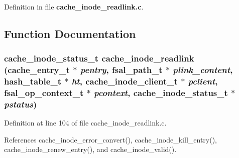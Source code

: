Definition in file {\bf cache\_\-inode\_\-readlink.c}.

\subsection{Function Documentation}
\subsubsection{\setlength{\rightskip}{0pt plus 5cm}cache\_\-inode\_\-status\_\-t cache\_\-inode\_\-readlink (cache\_\-entry\_\-t $\ast$ {\em pentry}, fsal\_\-path\_\-t $\ast$ {\em plink\_\-content}, hash\_\-table\_\-t $\ast$ {\em ht}, cache\_\-inode\_\-client\_\-t $\ast$ {\em pclient}, fsal\_\-op\_\-context\_\-t $\ast$ {\em pcontext}, cache\_\-inode\_\-status\_\-t $\ast$ {\em pstatus})}\label{cache__inode__readlink_8c_a0}




Definition at line 104 of file cache\_\-inode\_\-readlink.c.

References cache\_\-inode\_\-error\_\-convert(), cache\_\-inode\_\-kill\_\-entry(), cache\_\-inode\_\-renew\_\-entry(), and cache\_\-inode\_\-valid().